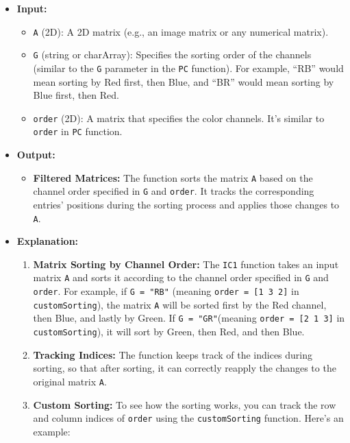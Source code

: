 \documentclass[11pt]{amsart}
\theoremstyle{remark}
\providecommand{\tightlist}{%
  \setlength{\itemsep}{0pt}\setlength{\parskip}{0pt}}
\theoremstyle{definition}
\theoremstyle{remark}
\numberwithin{equation}{section}
\begin{document}
\begin{itemize}
\item
  \textbf{Input:}

  \begin{itemize}
  \tightlist
  \item
    \texttt{A} (2D): A 2D matrix (e.g., an image matrix or any numerical
    matrix).
  \item
    \texttt{G} (string or charArray): Specifies the sorting order of the
    channels (similar to the \texttt{G} parameter in the \texttt{PC}
    function). For example, ``RB'' would mean sorting by Red first, then
    Blue, and ``BR'' would mean sorting by Blue first, then Red.
  \item
    \texttt{order} (2D): A matrix that specifies the color channels.
    It's similar to \texttt{order} in \texttt{PC} function.
  \end{itemize}
\item
  \textbf{Output:}

  \begin{itemize}
  \tightlist
  \item
    \textbf{Filtered Matrices:} The function sorts the matrix \texttt{A}
    based on the channel order specified in \texttt{G} and
    \texttt{order}. It tracks the corresponding entries' positions
    during the sorting process and applies those changes to \texttt{A}.
  \end{itemize}
\item
  \textbf{Explanation:}

  \begin{enumerate}
  \def\labelenumi{\arabic{enumi}.}
  \item
    \textbf{Matrix Sorting by Channel Order:} The \texttt{IC1} function
    takes an input matrix \texttt{A} and sorts it according to the
    channel order specified in \texttt{G} and \texttt{order}. For
    example, if \texttt{G\ =\ "RB"} (meaning
    \texttt{order\ =\ {[}1\ 3\ 2{]}} in \texttt{customSorting}), the
    matrix \texttt{A} will be sorted first by the Red channel, then
    Blue, and lastly by Green. If \texttt{G\ =\ "GR"}(meaning
    \texttt{order\ =\ {[}2\ 1\ 3{]}} in \texttt{customSorting}), it will
    sort by Green, then Red, and then Blue.
  \item
    \textbf{Tracking Indices:} The function keeps track of the indices
    during sorting, so that after sorting, it can correctly reapply the
    changes to the original matrix \texttt{A}.
  \item
    \textbf{Custom Sorting:} To see how the sorting works, you can track
    the row and column indices of \texttt{order} using the
    \texttt{customSorting} function. Here's an example:
  \end{enumerate}


\end{itemize}
\end{document}
